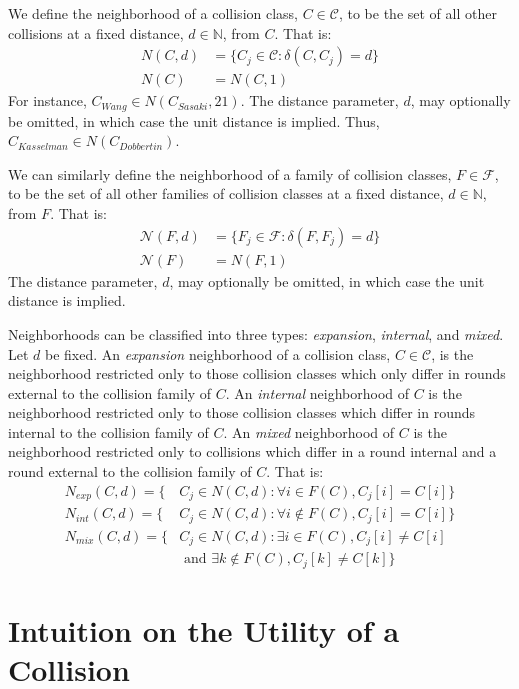 \documentclass[conference]{IEEEtran}
\begin{document}
We define the neighborhood of a collision class, $C \in \mathcal{C}$, to be the
set of all other collisions at a fixed distance, $d \in \mathbb{N}$, from $C$.
That is:
\begin{align}
    N(C, d) & = \{ C_j \in \mathcal{C} : \delta(C, C_j) = d \} \\
    N(C) & = N(C, 1)
\end{align}
For instance, $C_{Wang} \in N(C_{Sasaki}, 21)$. The distance parameter, $d$,
may optionally be omitted, in which case the unit distance is implied. Thus,
$C_{Kasselman} \in N(C_{Dobbertin})$.

We can similarly define the neighborhood of a family of collision classes,
$F \in \mathcal{F}$, to be the set of all other families of collision classes
at a fixed distance, $d \in \mathbb{N}$, from $F$. That is:
\begin{align}
    \mathcal{N}(F, d) & = \{ F_j \in \mathcal{F} : \delta(F, F_j) = d \} \\
    \mathcal{N}(F) & = N(F, 1)
\end{align}
The distance parameter, $d$, may optionally be omitted, in which case the unit
distance is implied.

Neighborhoods can be classified into three types: \textit{expansion},
\textit{internal}, and \textit{mixed}. Let $d$ be fixed. An \textit{expansion}
neighborhood of a collision class, $C \in \mathcal{C}$, is the neighborhood
restricted only to those collision classes which only differ in rounds external
to the collision family of $C$. An \textit{internal} neighborhood of $C$ is the
neighborhood restricted only to those collision classes which differ in rounds
internal to the collision family of $C$. An \textit{mixed} neighborhood of $C$
is the neighborhood restricted only to collisions which differ in a round
internal and a round external to the collision family of $C$. That is:
\begin{align*}
    N_{exp}(C, d) = \{ & C_{j} \in N(C, d) : \forall i \in F(C), C_j[i] = C[i] \} \\
    N_{int}(C, d) = \{ & C_{j} \in N(C, d) : \forall i \not\in F(C), C_j[i] = C[i] \} \\
    N_{mix}(C, d) = \{ & C_{j} \in N(C, d) : \exists i \in F(C), C_j[i] \neq C[i] \\
        & \text{ and } \exists k \not\in F(C), C_j[k] \neq C[k] \}
\end{align*}



\section{Intuition on the Utility of a Collision} \label{Sec:Intuition}
\end{document}
